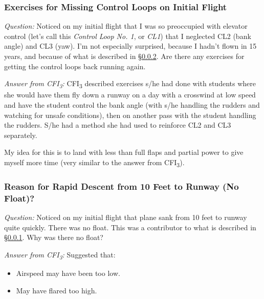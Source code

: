 \documentclass[letterpaper,10pt,titlepage]{article}
\begin{document}

\subsubsection{Exercises for Missing Control Loops on Initial Flight}
\label{sqsa0:slnd0:slhy0}

\emph{Question:} Noticed on my initial flight that I was so preoccupied with
elevator control (let's call this \emph{Control Loop No. 1}, or \emph{CL1})
that I neglected CL2 (bank angle) and CL3 (yaw).  I'm not especially surprised,
because I hadn't flown in 15 years, and because of what is described in
\S{}\ref{sqsa0:slnd0:srdf0}.  Are there any exercises for getting the control loops
back running again.

\noindent{}\emph{Answer from CFI\textsubscript{3}:}
CFI\textsubscript{3} described exercises s/he had done with students where she
would have them fly down a runway on a day with a crosswind at low speed and
have the student control the bank angle (with s/he
handling the rudders and watching for unsafe conditions), then on another
pass with the student handling the rudders.  S/he had a method she had used
to reinforce CL2 and CL3 separately.

My idea for this is to land with less than full flaps and partial power to give
myself more time (very similar to the answer from CFI\textsubscript{3}).



\subsubsection{Reason for Rapid Descent from 10 Feet to Runway (No Float)?}
\label{sqsa0:slnd0:srdf0}

\emph{Question:} Noticed on my initial flight that plane sank from 10 feet
to runway quite quickly.  There was no float.  This was a contributor to
what is described in \S{}\ref{sqsa0:slnd0:slhy0}.  Why was there no float?

\noindent{}\emph{Answer from CFI\textsubscript{3}:}  Suggested that:
\begin{itemize}
\item Airspeed may have been too low.
\item May have flared too high.
\end{itemize}
\end{document}
